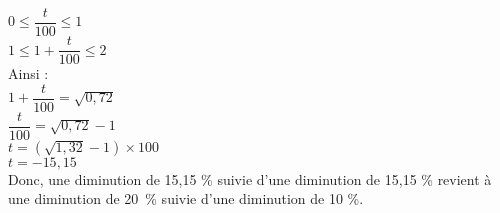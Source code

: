 $ 0 \leq \dfrac{t}{100} \leq 1 $ \\

$ 1 \leq 1 + \dfrac{t}{100} \leq 2 $ \\

Ainsi : \\

$1 + \dfrac{t}{100} = \sqrt{0,72} $ \\

$\dfrac{t}{100} = \sqrt{0,72} - 1 $ \\

$ t = \left(\sqrt{1,32} - 1 \right) \times 100 $ \\

$ t = -15,15 $ \\

Donc, une diminution de 15,15 \% suivie d'une diminution de 15,15 \% revient à une diminution de 20~\% suivie d'une diminution de 10 \%. 

\ifdefined\COMPLETE
\else
    
\fi
